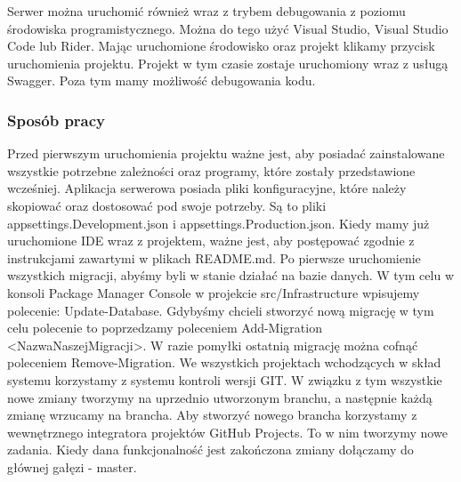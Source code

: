 \documentclass[a4paper,twoside,12pt]{book}
\begin{document}
Serwer można uruchomić również wraz z trybem debugowania z poziomu środowiska programistycznego. Można do tego użyć Visual Studio, Visual Studio Code lub Rider. Mając uruchomione środowisko oraz projekt klikamy przycisk uruchomienia projektu. Projekt w tym czasie zostaje uruchomiony wraz z usługą Swagger. Poza tym mamy możliwość debugowania kodu. 

\subsubsection{Sposób pracy}
Przed pierwszym uruchomienia projektu ważne jest, aby posiadać zainstalowane wszystkie potrzebne zależności oraz programy, które zostały przedstawione wcześniej. Aplikacja serwerowa posiada pliki konfiguracyjne, które należy skopiować oraz dostosować pod swoje potrzeby. Są to pliki appsettings.Development.json i appsettings.Production.json. Kiedy mamy już uruchomione IDE wraz z projektem, ważne jest, aby postępować zgodnie z instrukcjami zawartymi w plikach README.md. Po pierwsze uruchomienie wszystkich migracji, abyśmy byli w stanie działać na bazie danych. W tym celu w konsoli Package Manager Console w projekcie src/Infrastructure wpisujemy polecenie: Update-Database. Gdybyśmy chcieli stworzyć nową migrację w tym celu polecenie to poprzedzamy poleceniem Add-Migration <NazwaNaszejMigracji>. W razie pomyłki ostatnią migrację można cofnąć poleceniem Remove-Migration. We wszystkich projektach wchodzących w skład systemu korzystamy z systemu kontroli wersji GIT. W związku z tym wszystkie nowe zmiany tworzymy na uprzednio utworzonym branchu, a następnie każdą zmianę wrzucamy na brancha. Aby stworzyć nowego brancha korzystamy z wewnętrznego integratora projektów GitHub Projects. To w nim tworzymy nowe zadania. Kiedy dana funkcjonalność jest zakończona zmiany dołączamy do głównej gałęzi - master. 
\end{document}
